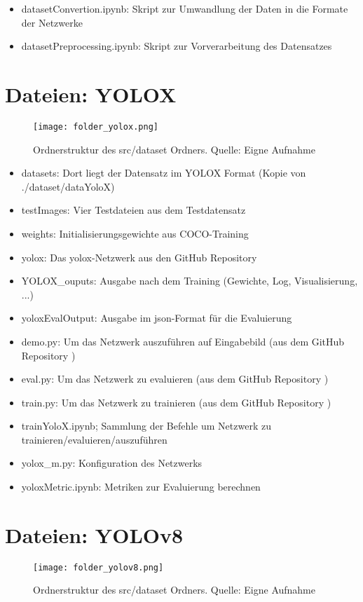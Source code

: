 \begin{itemize}
	\item datasetConvertion.ipynb: Skript zur Umwandlung der Daten in die Formate der Netzwerke
	\item datasetPreprocessing.ipynb: Skript zur Vorverarbeitung des Datensatzes
\end{itemize}



\section{Dateien: YOLOX}
\begin{figure}[h]
	\centering
	\texttt{[image: folder\_yolox.png]}
	\caption[Ordnerstruktur des src/dataset Ordners.]{Ordnerstruktur des src/dataset Ordners. Quelle: Eigne Aufnahme}
\end{figure}

\begin{itemize}
	\item datasets: Dort liegt der Datensatz im YOLOX Format (Kopie von ./dataset/dataYoloX)
	\item testImages: Vier Testdateien aus dem Testdatensatz
	\item weights: Initialisierungsgewichte aus COCO-Training
	\item yolox: Das yolox-Netzwerk aus den GitHub Repository \cite{yoloxGitHubRepo}
	\item YOLOX\_ouputs: Ausgabe nach dem Training (Gewichte, Log, Visualisierung, ...)
	\item yoloxEvalOutput: Ausgabe im json-Format für die Evaluierung
	\item demo.py: Um das Netzwerk auszuführen auf Eingabebild (aus dem GitHub Repository \cite{yoloxGitHubRepo})
	\item eval.py: Um das Netzwerk zu evaluieren (aus dem GitHub Repository \cite{yoloxGitHubRepo})
	\item train.py: Um das Netzwerk zu trainieren (aus dem GitHub Repository \cite{yoloxGitHubRepo})
	\item trainYoloX.ipynb; Sammlung der Befehle um Netzwerk zu trainieren/evaluieren/auszuführen
	\item yolox\_m.py: Konfiguration des Netzwerks
	\item yoloxMetric.ipynb: Metriken zur Evaluierung berechnen
\end{itemize}

\section{Dateien: YOLOv8}
\begin{figure}[h]
	\centering
	\texttt{[image: folder\_yolov8.png]}
	\caption[Ordnerstruktur des src/dataset Ordners.]{Ordnerstruktur des src/dataset Ordners. Quelle: Eigne Aufnahme}
\end{figure}

